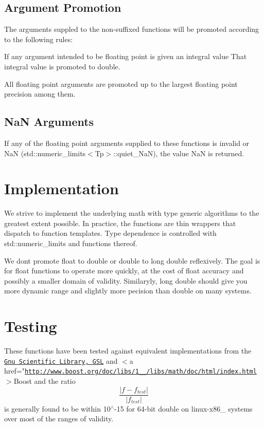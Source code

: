 \hypertarget{index_promotion}{}\subsection{Argument Promotion}\label{index_promotion}
The arguments suppled to the non-\/suffixed functions will be promoted according to the following rules\+:
\begin{DoxyEnumerate}
\item If any argument intended to be floating point is given an integral value That integral value is promoted to double.
\item All floating point arguments are promoted up to the largest floating point precision among them.
\end{DoxyEnumerate}\hypertarget{index_NaN}{}\subsection{Na\+N Arguments}\label{index_NaN}
If any of the floating point arguments supplied to these functions is invalid or NaN (std\+::numeric\+\_\+limits$<$\+Tp$>$\+::quiet\+\_\+\+NaN), the value NaN is returned.\hypertarget{index_impl}{}\section{Implementation}\label{index_impl}
We strive to implement the underlying math with type generic algorithms to the greatest extent possible. In practice, the functions are thin wrappers that dispatch to function templates. Type dependence is controlled with std\+::numeric\+\_\+limits and functions thereof.

We don\textquotesingle{}t promote {\ttfamily float} to {\ttfamily double} or {\ttfamily double} to {\ttfamily long double} reflexively. The goal is for {\ttfamily float} functions to operate more quickly, at the cost of {\ttfamily float} accuracy and possibly a smaller domain of validity. Similaryly, {\ttfamily long double} should give you more dynamic range and slightly more pecision than {\ttfamily double} on many systems.\hypertarget{index_testing}{}\section{Testing}\label{index_testing}
These functions have been tested against equivalent implementations from the \href{http://www.gnu.org/software/gsl}{\tt Gnu Scientific Library, G\+SL} and $<$a href="\href{http://www.boost.org/doc/libs/1_60_0/libs/math/doc/html/index.html}{\tt http\+://www.\+boost.\+org/doc/libs/1\+\_\+\_/libs/math/doc/html/index.\+html}$>$Boost and the ratio \[ \frac{|f - f_{test}|}{|f_{test}|} \] is generally found to be within 10$^\wedge$-\/15 for 64-\/bit double on linux-\/x86\+\_ systems over most of the ranges of validity.

